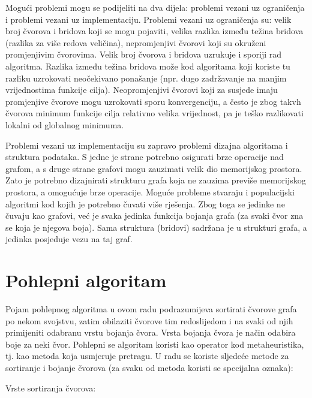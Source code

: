 \documentclass[times, utf8, diplomski, numeric]{fer}
\begin{document}
Mogući problemi mogu se podijeliti na dva dijela: problemi vezani uz ograničenja i problemi vezani uz implementaciju. Problemi vezani uz ograničenja su: velik broj čvorova i bridova koji se mogu pojaviti, velika razlika između težina bridova (razlika za više redova veličina), nepromjenjivi čvorovi koji su okruženi promjenjivim čvorovima. Velik broj čvorova i bridova uzrukuje i sporiji rad algoritma. Razlika između težina bridova može kod algoritama koji koriste tu razliku uzrokovati neočekivano ponašanje (npr. dugo zadržavanje na manjim vrijednostima funkcije cilja). Neopromjenjivi čvorovi koji za susjede imaju promjenjive čvorove mogu uzrokovati sporu konvergenciju, a često je zbog takvh čvorova minimum funkcije cilja relativno velika vrijednost, pa je teško razlikovati lokalni od globalnog minimuma. 

Problemi vezani uz implementaciju su zapravo problemi dizajna algoritama i struktura podataka. S jedne je strane potrebno osigurati brze operacije nad grafom, a s druge strane grafovi mogu zauzimati velik dio memorijskog prostora. Zato je potrebno dizajnirati strukturu grafa koja ne zauzima previše memorijskog prostora, a omogućuje brze operacije. Moguće probleme stvaraju i populacijski algoritmi kod kojih je potrebno čuvati više rješenja. Zbog toga se jedinke ne čuvaju kao grafovi, već je svaka jedinka funkcija bojanja grafa (za svaki čvor zna se koja je njegova boja). Sama struktura (bridovi) sadržana je u strukturi grafa, a jedinka posjeduje vezu na taj graf.

\section{Pohlepni algoritam}

Pojam pohlepnog algoritma u ovom radu podrazumijeva sortirati čvorove grafa po nekom svojstvu, zatim obilaziti čvorove tim redoslijedom i na svaki od njih primijeniti odabranu vrstu bojanja čvora. Vrsta bojanja čvora je način odabira boje za neki čvor. Pohlepni se algoritam koristi kao operator kod metaheuristika, tj. kao metoda koja usmjeruje pretragu.
U radu se koriste sljedeće metode za sortiranje i bojanje čvorova (za svaku od metoda koristi se specijalna oznaka):

Vrste sortiranja čvorova:
\end{document}
